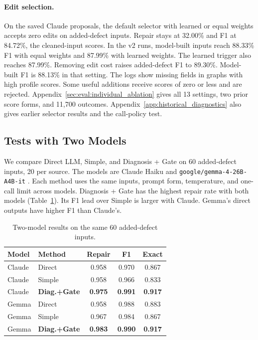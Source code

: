 \paragraph{Edit selection.}
On the saved Claude proposals, the default selector with learned or equal
weights accepts zero edits on added-defect inputs. Repair stays at 32.00\%
and F1 at 84.72\%, the cleaned-input scores.
In the v2 runs, model-built inputs reach 88.33\% F1 with equal weights
and 87.99\% with learned weights. The learned trigger also reaches 87.99\%.
Removing edit cost raises added-defect F1 to 89.30\%.
Model-built F1 is 88.13\% in that setting.
The logs show missing fields in graphs with high profile scores.
Some useful additions receive scores of zero or less and are rejected.
Appendix~\ref{sec:eval:individual_ablation} gives all 13 settings, two prior
score forms, and 11,700 outcomes. Appendix~\ref{app:historical_diagnostics}
also gives earlier selector results and the call-policy test.

\subsection{Tests with Two Models}
\label{sec:eval:crossmodel}

We compare Direct LLM, Simple, and Diagnosis + Gate on 60 added-defect
inputs, 20 per source. The models are Claude Haiku and
\texttt{google/gemma-4-26B-A4B-it} \citep{ref_gemma4}.
Each method uses the same inputs, prompt form, temperature, and one-call
limit across models. Diagnosis + Gate has the highest repair rate with
both models (Table~\ref{tab:cross_model}). Its F1 lead over Simple is larger
with Claude. Gemma's direct outputs have higher F1 than Claude's.

\begin{table}[t]
\centering
\caption{Two-model results on the same 60 added-defect inputs.}
\label{tab:cross_model}
\small
\begin{tabular}{l l c c c}
\toprule
Model & Method & Repair & F1 & Exact \\
\midrule
Claude & Direct & 0.958 & 0.970 & 0.867 \\
Claude & Simple & 0.958 & 0.966 & 0.833 \\
Claude & \textbf{Diag.+Gate} & \textbf{0.975} & \textbf{0.991} & \textbf{0.917} \\
\midrule
Gemma & Direct & 0.958 & 0.988 & 0.883 \\
Gemma & Simple & 0.967 & 0.984 & 0.867 \\
Gemma & \textbf{Diag.+Gate} & \textbf{0.983} & \textbf{0.990} & \textbf{0.917} \\
\bottomrule
\end{tabular}
\end{table}

